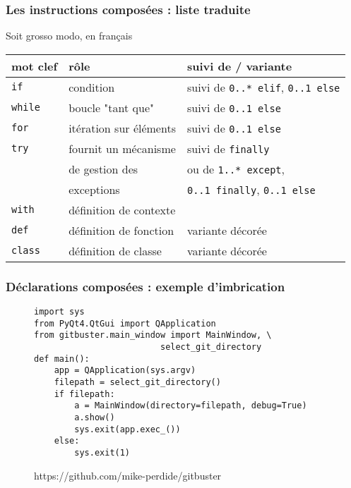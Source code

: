 \begin{frame}[fragile]
  \frametitle{Les instructions composées : liste traduite}
Soit grosso modo, en français
\small\begin{tabular}{|l|l|l|}
\hline
mot clef & rôle & suivi de / variante \\
\hline \hline
\texttt{if} & condition & suivi de \texttt{0..* elif}, \texttt{0..1 else}\\ \hline
\texttt{while} & boucle "tant que" & suivi de \texttt{0..1 else}\\ \hline
\texttt{for} & itération sur éléments & suivi de \texttt{0..1 else}\\ \hline
\texttt{try} & fournit un mécanisme & suivi de \texttt{finally}\\
 & de gestion des &  ou de \texttt{1..* except}, \\
 & exceptions & \texttt{0..1 finally}, \texttt{0..1 else}\\ \hline
\texttt{with} & définition de contexte & \\ \hline
\texttt{def} & définition de fonction & variante décorée \\ \hline
\texttt{class} & définition de classe & variante décorée \\ \hline
\end{tabular}
\end{frame}


\begin{frame}[fragile]
  \frametitle{Déclarations composées : exemple d'imbrication}
\begin{figure}
\tiny{\begin{lstlisting}import sys
from PyQt4.QtGui import QApplication
from gitbuster.main_window import MainWindow, \
                         select_git_directory
def main():
    app = QApplication(sys.argv)
    filepath = select_git_directory()
    if filepath:
        a = MainWindow(directory=filepath, debug=True)
        a.show()
        sys.exit(app.exec_())
    else:
        sys.exit(1)
  \end{lstlisting}}
\def\figurename{Code source de gitbuster}
\caption{https://github.com/mike-perdide/gitbuster}
\end{figure}
\end{frame}

